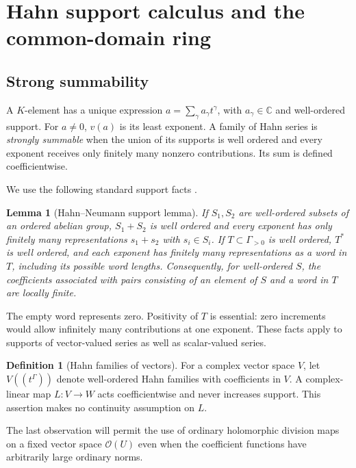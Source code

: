 \documentclass[11pt]{article}
\newtheorem{lemma}[theorem]{Lemma}
\theoremstyle{definition}
\newtheorem{definition}[theorem]{Definition}
\newcommand{\C}{\mathbb C}
\newcommand{\OO}{\mathcal O}
\begin{document}
\section{Hahn support calculus and the common-domain ring}\label{sec:support}
\subsection{Strong summability}
A $K$-element has a unique expression $a=\sum_\gamma a_\gamma t^\gamma$, with $a_\gamma\in\C$ and well-ordered support. For $a\ne0$, $v(a)$ is its least exponent. A family of Hahn series is \emph{strongly summable} when the union of its supports is well ordered and every exponent receives only finitely many nonzero contributions. Its sum is defined coefficientwise.

We use the following standard support facts \cite{Neumann,Poonen}.
\begin{lemma}[Hahn--Neumann support lemma]\label{lem:neumann}
If $S_1,S_2$ are well-ordered subsets of an ordered abelian group, $S_1+S_2$ is well ordered and every exponent has only finitely many representations $s_1+s_2$ with $s_i\in S_i$. If $T\subset\Gamma_{>0}$ is well ordered, $T^*$ is well ordered, and each exponent has finitely many representations as a word in $T$, including its possible word lengths. Consequently, for well-ordered $S$, the coefficients associated with pairs consisting of an element of $S$ and a word in $T$ are locally finite.
\end{lemma}
The empty word represents zero. Positivity of $T$ is essential: zero increments would allow infinitely many contributions at one exponent. These facts apply to supports of vector-valued series as well as scalar-valued series.

\begin{definition}[Hahn families of vectors]
For a complex vector space $V$, let $V((t^\Gamma))$ denote well-ordered Hahn families with coefficients in $V$. A complex-linear map $L:V\to W$ acts coefficientwise and never increases support. This assertion makes no continuity assumption on $L$.
\end{definition}
The last observation will permit the use of ordinary holomorphic division maps on a fixed vector space $\OO(U)$ even when the coefficient functions have arbitrarily large ordinary norms.
\end{document}
